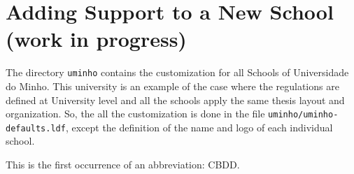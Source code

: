 
%

\glsresetall

\chapter{Adding Support to a New School (work in progress)}
\label{cha:porting_novathesis}



The directory \verb!uminho! contains the customization for all Schools of Universidade do Minho.  This university is an example of the case where the regulations are defined at University level and all the schools apply the same thesis layout and organization.  So, the all the customization is done in the file \verb!uminho/uminho-defaults.ldf!, except the definition of the name and logo of each individual school.

This is the first occurrence of an abbreviation: \gls{CBDD}. 
